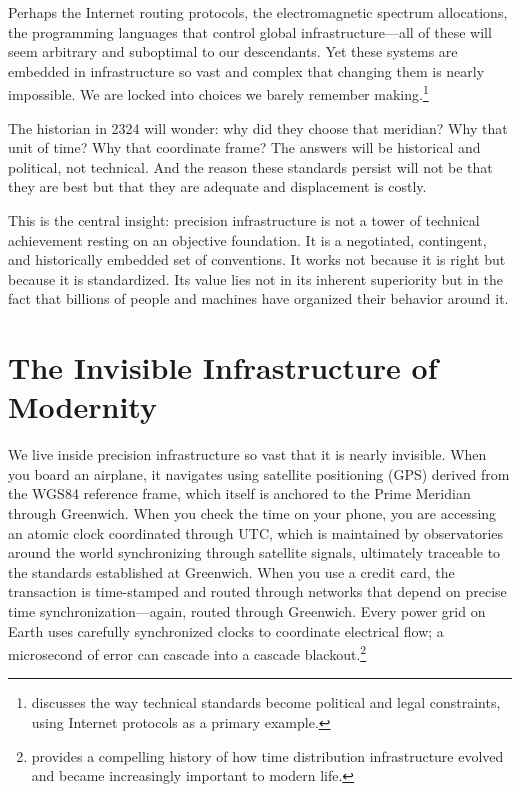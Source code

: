 Perhaps the Internet routing protocols, the electromagnetic spectrum allocations, the programming languages that control global infrastructure---all of these will seem arbitrary and suboptimal to our descendants. Yet these systems are embedded in infrastructure so vast and complex that changing them is nearly impossible. We are locked into choices we barely remember making.\footnote{\textcite{Lessig2006} discusses the way technical standards become political and legal constraints, using Internet protocols as a primary example.}

The historian in 2324 will wonder: why did they choose that meridian? Why that unit of time? Why that coordinate frame? The answers will be historical and political, not technical. And the reason these standards persist will not be that they are best but that they are adequate and displacement is costly.

This is the central insight: precision infrastructure is not a tower of technical achievement resting on an objective foundation. It is a negotiated, contingent, and historically embedded set of conventions. It works not because it is right but because it is standardized. Its value lies not in its inherent superiority but in the fact that billions of people and machines have organized their behavior around it.

\section{The Invisible Infrastructure of Modernity}

We live inside precision infrastructure so vast that it is nearly invisible. When you board an airplane, it navigates using satellite positioning (\textsc{GPS}) derived from the \textsc{WGS84} reference frame, which itself is anchored to the Prime Meridian through Greenwich. When you check the time on your phone, you are accessing an atomic clock coordinated through \textsc{UTC}, which is maintained by observatories around the world synchronizing through satellite signals, ultimately traceable to the standards established at Greenwich. When you use a credit card, the transaction is time-stamped and routed through networks that depend on precise time synchronization---again, routed through Greenwich. Every power grid on Earth uses carefully synchronized clocks to coordinate electrical flow; a microsecond of error can cascade into a cascade blackout.\footnote{\textcite{Bartky2007} provides a compelling history of how time distribution infrastructure evolved and became increasingly important to modern life.}

